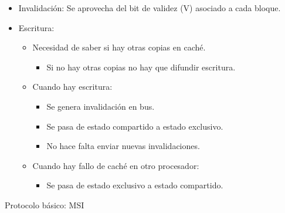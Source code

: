 \documentclass[12pt, twoside, openright]{report} %
\begin{document}
    \begin{itemize}
    
    \item
      Invalidación: Se aprovecha del bit de validez (V) asociado a
      cada bloque.
    \item
      Escritura:

      \begin{itemize}
      
      \item
        Necesidad de saber si hay otras copias en caché.

        \begin{itemize}
        
        \item
          Si no hay otras copias no hay que difundir escritura.
        \end{itemize}
      \item
        Cuando hay escritura:

        \begin{itemize}
        
        \item
          Se genera invalidación en bus.
        \item
          Se pasa de estado compartido a estado exclusivo.
        \item
          No hace falta enviar nuevas invalidaciones.
        \end{itemize}
      \item
        Cuando hay fallo de caché en otro procesador:

        \begin{itemize}
        
        \item
          Se pasa de estado exclusivo a estado compartido.
        \end{itemize}
      \end{itemize}
    \end{itemize}

    Protocolo básico: MSI
\end{document}

